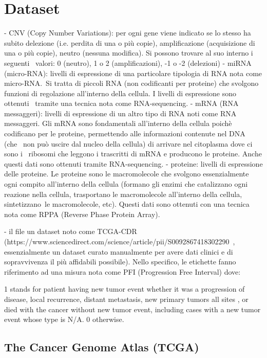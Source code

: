 \documentclass[12pt,italian]{report}
\begin{document}
	\chapter{Dataset}
	- CNV (Copy Number Variations): per ogni gene viene indicato se lo stesso
	ha subito delezione (i.e. perdita di una o più copie), amplificazione (acquisizione di una
	o più copie), neutro (nessuna modifica). Si possono trovare al suo interno i seguenti 
	valori: 0 (neutro), 1 o 2 (amplificazioni), -1 o -2 (delezioni)
	- miRNA (micro-RNA): livelli di espressione di una particolare tipologia di RNA nota
	come micro-RNA. Si tratta di piccoli RNA (non codificanti per proteine) che svolgono 
	funzioni di regolazione all'interno della cellula. I livelli di espressione sono ottenuti 
	tramite una tecnica nota come RNA-sequencing.
	- mRNA (RNA messaggeri):   livelli di espressione di un altro tipo di RNA noti come
	RNA messaggeri. Gli mRNA sono fondamentali all'interno della cellula poichè
	codificano per le proteine, permettendo alle informazioni contenute nel DNA (che 
	non può uscire dal nucleo della cellula) di arrivare nel citoplasma dove ci sono i 
	ribosomi che leggono i trascritti di mRNA e producono le proteine. Anche questi
	dati sono ottenuti tramite RNA-sequencing.
	- proteine: livelli di espressione delle proteine. Le proteine sono le macromolecole
	che svolgono essenzialmente ogni compito all'interno della cellula (formano
	gli enzimi che catalizzano ogni reazione nella cellula, trasportano le macromolecole
	all'interno della cellula, sintetizzano le macromolecole, etc). Questi dati sono ottenuti
	con una tecnica nota come RPPA (Reverse Phase Protein Array).
	
	- il file %
	un dataset noto come TCGA-CDR (https://www.sciencedirect.com/science/article/pii/S0092867418302290 , 
	essenzialmente un dataset curato manualmente per avere
	dati clinici e di sopravvivenza il più affidabili possibile). Nello specifico, le etichette fanno riferimento
	ad una misura nota come PFI (Progression Free Interval) dove:
	
	1 stands for patient having new tumor event whether it was a progression of disease, local recurrence, distant metastasis, new primary tumors all sites , or died with the cancer without new tumor event, including cases with a new tumor event whose type is N/A. 0 otherwise.
	\section{The Cancer Genome Atlas (TCGA)}
\end{document}

